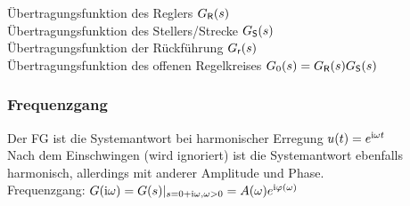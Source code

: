 \documentclass[fs, footer]{latex4ei}
\begin{document}
\begin{multicols*}{4}
{	
	Übertragungsfunktion des Reglers $G_{\sf R}(s)$\\
	Übertragungsfunktion des Stellers/Strecke $G_{\sf S}(s)$\\
	Übertragungsfunktion der Rückführung $G_{\sf r}(s)$\\
	Übertragungsfunktion des offenen Regelkreises $G_0(s) = G_{\sf R}(s) G_{\sf S}(s)$\\
	

	\subsubsection{Frequenzgang}
	Der FG ist die Systemantwort bei harmonischer Erregung $u(t) = e^{\mathrm{i} \omega t}$\\
	Nach dem Einschwingen (wird ignoriert) ist die Systemantwort ebenfalls harmonisch, allerdings mit anderer Amplitude und Phase.\\
	Frequenzgang: $G(\mathrm{i} \omega) = G(s)|_{s = 0 + \mathrm{i} \omega, \omega > 0} = A(\omega) e^{\mathrm{i} \varphi(\omega)}$
}


\end{multicols*}
\end{document}
